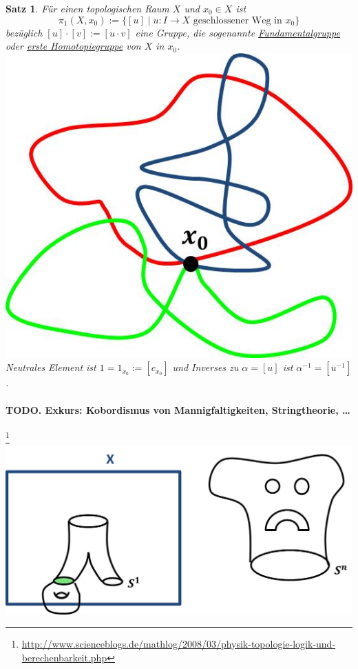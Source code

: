 \documentclass[a4paper,11pt,notitlepage]{report}
\newtheorem{theorem}{Satz}[chapter]
\begin{document}
\begin{theorem}{}
	Für einen topologischen Raum $X$ und $x_0 \in X$ ist 
	$$\pi_1 (X,x_0) := \{ [u] \mid u \colon I \rightarrow X \text{ geschlossener Weg in } x_0 \}$$
	bezüglich $[u] \cdot [v] := [u \cdot v]$ eine Gruppe, die sogenannte \underline{Fundamentalgruppe} oder \underline{erste Homotopiegruppe} von $X$ in $x_0$. \includegraphics[scale=0.4]{images/Fundamentalgruppe.jpg}
	\newline
	Neutrales Element ist $1 = 1_{x_0} := [c_{x_0}]$ \newline und Inverses zu $\alpha = [u]$ ist $\alpha^{-1} = [u^{-1}]$.
\end{theorem}

\paragraph{TODO. Exkurs: Kobordismus von Mannigfaltigkeiten, Stringtheorie, \ldots}\footnote{\url{http://www.scienceblogs.de/mathlog/2008/03/physik-topologie-logik-und-berechenbarkeit.php}} \includegraphics[scale=0.4]{images/Kobordismus.jpg} 
\end{document}
